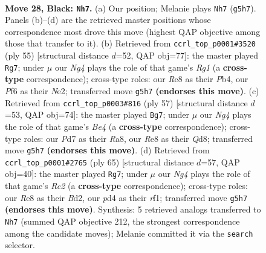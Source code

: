 \documentclass[11pt]{article}
\begin{document}
\clearpage

\begin{figure}[p]\centering
\begin{subfigure}{0.46\textwidth}\centering
\resizebox{\linewidth}{!}{%
\newchessgame
\chessboard[
  setfen={4r2k/p1ppq3/5p1Q/6n1/1pPP4/P7/2P2P1P/1R4K1 b - - 2 28},
  showmover=false,
  pgfstyle=straightmove, color=movearrow, markmove={g5-h7}
]}
\caption{}
\end{subfigure}\hfill
\begin{subfigure}{0.46\textwidth}\centering
\resizebox{\linewidth}{!}{%
\newchessgame
\chessboard[
  setfen={6r1/p4Q1k/3p4/2qp3P/1p2P3/8/PPP1n3/1K1R4 b - - 0 28},
  showmover=false,
  pgfstyle=straightmove, color=movearrow, markmove={g8-g7}
]}
\caption{}
\end{subfigure}
\\[4pt]
\begin{subfigure}{0.46\textwidth}\centering
\resizebox{\linewidth}{!}{%
\newchessgame
\chessboard[
  setfen={r2q2k1/p2b4/3Pp1Q1/2p1b1p1/6P1/P7/6P1/2R2B1K b - - 0 29},
  showmover=false,
  pgfstyle=straightmove, color=movearrow, markmove={e5-g7}
]}
\caption{}
\end{subfigure}\hfill
\begin{subfigure}{0.46\textwidth}\centering
\resizebox{\linewidth}{!}{%
\newchessgame
\chessboard[
  setfen={2q4k/p1r4p/1p6/8/2PQ4/4p1P1/PP1b3P/5RK1 b - - 3 33},
  showmover=false,
  pgfstyle=straightmove, color=movearrow, markmove={c7-g7}
]}
\caption{}
\end{subfigure}
\caption{\textbf{Move 28, Black: \texttt{Nh7}.} (a) Our position; Melanie plays \texttt{Nh7} (\texttt{g5h7}). Panels (b)--(d) are the retrieved master positions whose correspondence most drove this move (highest QAP objective among those that transfer to it). (b) Retrieved from \texttt{ccrl\_top\_p0001\#3520} (ply 55) [structural distance $d$=52, QAP obj=77]: the master played \texttt{Rg7}; under $\mu$ our \emph{Ng4} plays the role of that game's \emph{Rg1} (a \textbf{cross-type} correspondence); cross-type roles: our \emph{R}e8 as their \emph{P}b4, our \emph{P}f6 as their \emph{N}e2; transferred move \texttt{g5h7} \textbf{(endorses this move)}. (c) Retrieved from \texttt{ccrl\_top\_p0003\#816} (ply 57) [structural distance $d$=53, QAP obj=74]: the master played \texttt{Bg7}; under $\mu$ our \emph{Ng4} plays the role of that game's \emph{Be4} (a \textbf{cross-type} correspondence); cross-type roles: our \emph{P}d7 as their \emph{R}a8, our \emph{R}e8 as their \emph{Q}d8; transferred move \texttt{g5h7} \textbf{(endorses this move)}. (d) Retrieved from \texttt{ccrl\_top\_p0001\#2765} (ply 65) [structural distance $d$=57, QAP obj=40]: the master played \texttt{Rg7}; under $\mu$ our \emph{Ng4} plays the role of that game's \emph{Rc2} (a \textbf{cross-type} correspondence); cross-type roles: our \emph{R}e8 as their \emph{B}d2, our \emph{p}d4 as their \emph{r}f1; transferred move \texttt{g5h7} \textbf{(endorses this move)}. Synthesis: 5 retrieved analogs transferred to \texttt{Nh7} (summed QAP objective 212, the strongest correspondence among the candidate moves); Melanie committed it via the \texttt{search} selector.}
\label{fig:thought-m55}
\end{figure}
\end{document}

